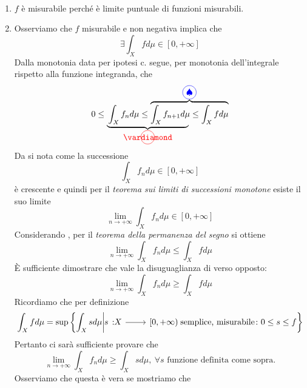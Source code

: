\begin{demonstrationcaputwt}~
	\begin{enumerate}[label=\Roman*]
		\item $f$ è misurabile perché è limite puntuale di funzioni misurabili.
		\item Osserviamo che $f$ misurabile e non negativa implica che
		\begin{equation*}
			\exists\int_Xfd\mu\in\left[0,+\infty\right]
		\end{equation*}
		Dalla monotonia data per ipotesi c. segue, per monotonia dell'integrale rispetto alla funzione integranda, che
	\begin{equation*}
		0\leq\lefteqn{\underbrace{\phantom{\int_Xf_nd\mu\leq\int_Xf_{n+1}d\mu}}_{\circled[red]{\vardiamond}}}\int_Xf_nd\mu\leq
		\overbrace{\int_Xf_{n+1}d\mu\leq \int_Xfd\mu}^{\circled[blue]{\spadesuit}}
	\end{equation*}
		Da \circled[red]{\vardiamond} si nota come la successione
	\begin{equation*}
		\int_Xf_nd\mu\in\left[0,+\infty\right]
	\end{equation*}
		è crescente e quindi per il \textit{teorema sui limiti di successioni monotone} esiste il suo limite
\begin{equation*}
	\lim_{n\to+\infty}\int_Xf_nd\mu\in\left[0,+\infty\right]
\end{equation*}
Considerando \circled[blue]{\spadesuit}, per il \textit{teorema della permanenza del segno} si ottiene
\begin{equation*}
	\lim_{n\to+\infty}\int_Xf_nd\mu\leq \int_Xfd\mu
\end{equation*}
È sufficiente dimostrare che vale la disuguaglianza di verso opposto:
\begin{equation*}
	\lim_{n\to+\infty}\int_Xf_nd\mu\geq \int_Xfd\mu
\end{equation*}
Ricordiamo che per definizione
\begin{equation*}
	\int_Xfd\mu=\sup\left\{\int_Xsd\mu\middle| \funz{s}{X}{\left[0,+\infty\right)}\text{ semplice, misurabile}\colon0\leq s\leq f\right\}
\end{equation*}
Pertanto ci sarà sufficiente provare che
\begin{equation*}
	\lim_{n\to+\infty}\int_Xf_nd\mu\geq \int_Xsd\mu,\ \forall s\text{ funzione definita come sopra.}
\end{equation*}
Osserviamo che questa è vera se mostriamo che
\begin{equation*}

\end{equation*}
\end{enumerate}
\end{demonstrationcaputwt}
